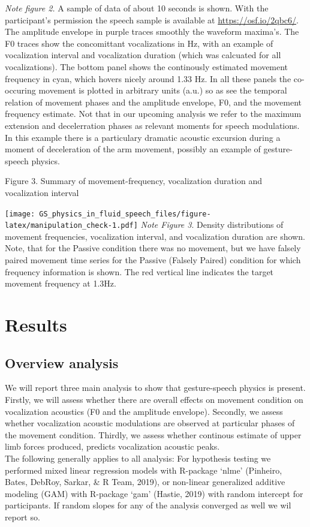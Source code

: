 \documentclass[
  man,floatsintext]{apa6}
\begin{document}
\emph{Note figure 2.} A sample of data of about 10 seconds is shown. With the participant's permission the speech sample is available at \url{https://osf.io/2qbc6/}. The amplitude envelope in purple traces smoothly the waveform maxima's. The F0 traces show the concomittant vocalizations in Hz, with an example of vocalization interval and vocalization duration (which was calcuated for all vocalizations). The bottom panel shows the continously estimated movement frequency in cyan, which hovers nicely around 1.33 Hz. In all these panels the co-occuring movement is plotted in arbitrary units (a.u.) so as see the temporal relation of movement phases and the amplitude envelope, F0, and the movement frequency estimate. Not that in our upcoming analysis we refer to the maximum extension and decelerration phases as relevant moments for speech modulations. In this example there is a particulary dramatic acoustic excursion during a moment of deceleration of the arm movement, possibly an example of gesture-speech physics.

Figure 3. Summary of movement-frequency, vocalization duration and vocalization interval

\texttt{[image: GS\_physics\_in\_fluid\_speech\_files/figure-latex/manipulation\_check-1.pdf]}
\emph{Note Figure 3}. Density distributions of movement frequencies, vocalization interval, and vocalization duration are shown. Note, that for the Passive condition there was no movement, but we have falsely paired movement time series for the Passive (Falsely Paired) condition for which frequency information is shown. The red vertical line indicates the target movement frequency at 1.3Hz.

\hypertarget{results}{%
\section{Results}\label{results}}

\hypertarget{overview-analysis}{%
\subsection{Overview analysis}\label{overview-analysis}}

We will report three main analysis to show that gesture-speech physics is present. Firstly, we will assess whether there are overall effects on movement condition on vocalization acoustics (F0 and the amplitude envelope). Secondly, we assess whether vocalization acoustic modulations are observed at particular phases of the movement condition. Thirdly, we assess whether continous estimate of upper limb forces produced, predicts vocalization acoustic peaks.\\
The following generally applies to all analysis: For hypothesis testing we performed mixed linear regression models with R-package `nlme' (Pinheiro, Bates, DebRoy, Sarkar, \& R Team, 2019), or non-linear generalized additive modeling (GAM) with R-package `gam' (Hastie, 2019) with random intercept for participants. If random slopes for any of the analysis converged as well we wil report so.
\end{document}
